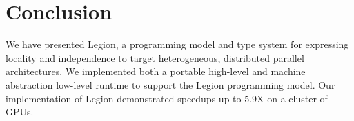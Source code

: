 
\section{Conclusion}
We have presented Legion, a programming model and
type system for expressing locality and independence
to target heterogeneous, distributed parallel architectures.  
We implemented both a portable high-level and machine 
abstraction low-level runtime to support the Legion 
programming model.  Our implementation of Legion demonstrated
speedups up to 5.9X on a cluster of GPUs.
